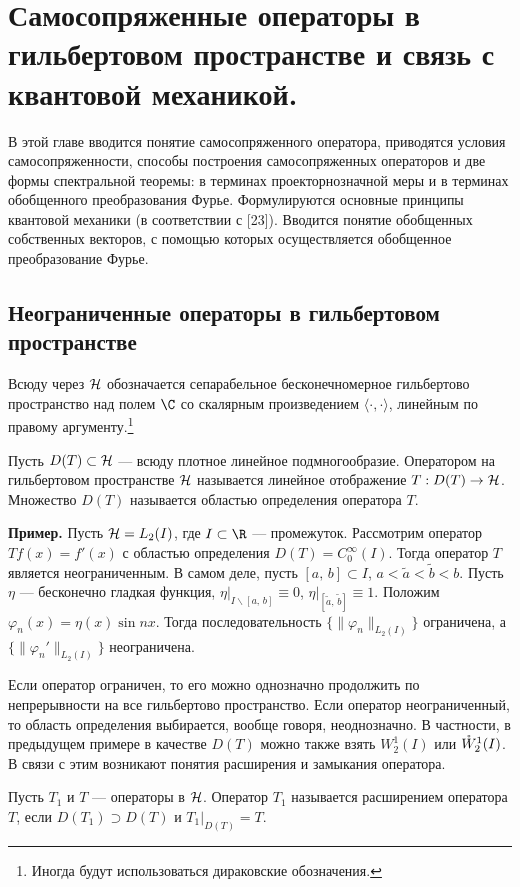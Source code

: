 \documentclass[a4paper
]{article}
\begin{document}
\section{Самосопряженные операторы в гильбертовом пространстве
и связь с квантовой механикой.}
В этой главе вводится понятие самосопряженного оператора, приводятся
условия самосопряженности, способы построения самосопряженных
операторов и две формы спектральной теоремы: в терминах
проекторнозначной меры и в терминах обобщенного преобразования
Фурье. Формулируются основные принципы квантовой механики (в
соответствии с [23]). Вводится понятие обобщенных собственных
векторов, с помощью которых осуществляется обобщенное преобразование
Фурье.
\subsection{Неограниченные операторы в гильбертовом пространстве}
Всюду через ${\cal H}$ обозначается сепарабельное бесконечномерное
гильбертово пространство над полем $\C$ со скалярным произведением
$\langle \cdot, \cdot\rangle$, линейным по правому аргументу.\footnote{Иногда будут
использоваться дираковские обозначения.}
\begin{Def}
Пусть $D(T)\subset {\cal H}$ --- всюду плотное линейное подмногообразие.
Оператором на гильбертовом пространстве ${\cal H}$ называется
линейное отображение $T:D(T)\rightarrow {\cal H}$. Множество $D(T)$
называется областью определения оператора $T$.
\end{Def}
{\bf Пример.} Пусть ${\cal H}=L_2(I)$, где $I\subset \R$ ---
промежуток. Рассмотрим оператор $Tf(x)=f'(x)$ с областью определения
$D(T)=C_0^\infty (I)$. Тогда оператор $T$ является неограниченным.
В самом деле, пусть $[a, \, b]\subset I$, $a<\tilde a<\tilde b<b$.
Пусть $\eta$ --- бесконечно гладкая функция, $\eta|_{I\backslash [a, \, b]}
\equiv 0$, $\eta|_{[\tilde a, \, \tilde b]}\equiv 1$. Положим
$\varphi_n(x)=\eta(x)\sin nx$. Тогда последовательность $\{\|\varphi_n\|
_{L_2(I)}\}$ ограничена, а $\{\|\varphi_n'\|_{L_2(I)}\}$ неограничена.
\par
Если оператор ограничен, то его можно однозначно продолжить по
непрерывности на все гильбертово пространство. Если оператор
неограниченный, то область определения выбирается, вообще говоря,
неоднозначно. В частности, в предыдущем примере в качестве $D(T)$
можно также взять $W^1_2(I)$ или $\mathaccent'27 W^1_2(I)$. В связи
с этим возникают понятия расширения и замыкания оператора.
\begin{Def}
Пусть $T_1$ и $T$ --- операторы в ${\cal H}$. Оператор $T_1$ называется
расширением оператора $T$, если $D(T_1)\supset D(T)$ и $T_1|_{D(T)}=T$.
\end{Def}
\end{document}
